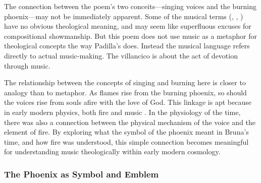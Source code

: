 The connection between the poem's two conceits---singing voices and the burning phoenix---may not be immediately apparent.
Some of the musical terms (, , ) have no obvious theological meaning, and may seem like superfluous excuses for compositional showmanship.
But this poem does not use music as a metaphor for theological concepts the way Padilla's  does.
Instead the musical language refers directly to actual music-making.
The villancico is about the act of devotion through music.

The relationship between the concepts of singing and burning here is closer to analogy than to metaphor.
As flames rise from the burning phoenix, so should the voices rise from souls afire with the love of God.
This linkage is apt because in early modern physics, both fire and music .
In the physiology of the time, there was also a connection between the physical mechanism of the voice and the element of fire.
By exploring what the symbol of the phoenix meant in Bruna's time, and how fire was understood, this simple connection becomes meaningful for understanding music theologically within early modern cosmology.

\subsubsection{The Phoenix as Symbol and Emblem}

